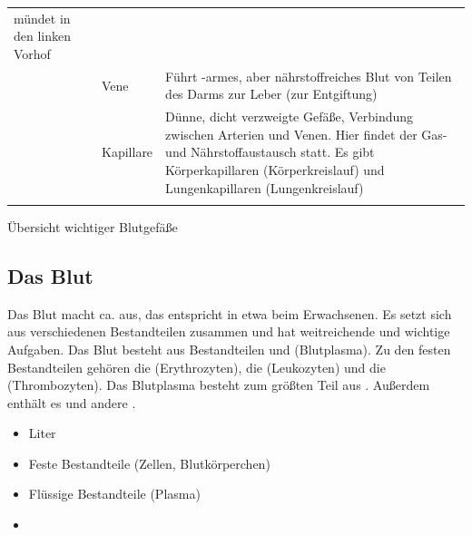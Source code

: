 {\begin{tabulary}{\linewidth}{lllL}
mündet in den linken Vorhof
\\\addlinespace
{} \label{topic:pfortader}
&
&
Vene
&
Führt -armes, aber nährstoffreiches Blut von Teilen des Darms zur
Leber (zur Entgiftung)
\\\addlinespace
{} 
&
 
&
Kapillare
&
Dünne, dicht verzweigte Gefäße, Verbindung zwischen Arterien
und Venen. Hier findet der Gas- und Nährstoffaustausch statt. Es gibt
Körperkapillaren (Körperkreislauf) und Lungenkapillaren
(Lungenkreislauf)
\\\addlinespace\bottomrule
\end{tabulary}

}
{Übersicht wichtiger Blutgefäße\label{topic:blutgefaesse-wichtige}}
{}

\clearpage %

\subsection{Das Blut}\label{topic:blut}


{%
Das Blut macht ca. 
aus, das entspricht in etwa  beim
Erwachsenen. Es setzt sich aus verschiedenen Bestandteilen
zusammen und hat weitreichende und wichtige Aufgaben. 
Das Blut besteht aus
 Bestandteilen und 
(Blutplasma).
Zu
den festen Bestandteilen gehören die  (Erythrozyten), die  (Leukozyten) und die 
(Thrombozyten).
Das Blutplasma besteht zum größten Teil aus .
Außerdem enthält es  und andere .
}{
\begin{itemize}
  \item {} Liter
  \item Feste Bestandteile (Zellen, Blutkörperchen)
  \item Flüssige Bestandteile (Plasma)
  \item {}
\end{itemize}
}{}{}{}



